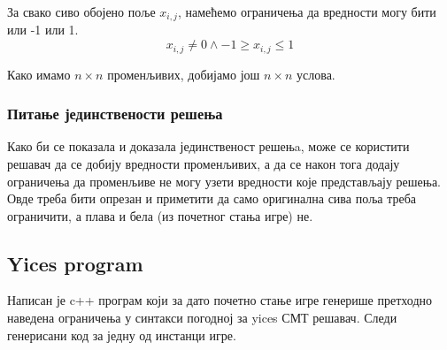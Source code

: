 \documentclass[a4paper]{article}
\begin{document}
За свако сиво обојено поље $x_{i, j}$, намећемо ограничења да вредности могу бити или -1 или 1.
$$
    x_{i, j} \neq 0 \land -1 \geq x_{i, j} \leq 1
$$

Како имамо $n \times n$ променљивих, добијамо још $n \times n$ услова.

\subsubsection{Питање јединствености решења}
Како би се показала и доказала јединственост решењa, може се користити решавач да се добију вредности променљивих, а да се након тога
додају ограничења да променљиве не могу узети вредности које представљају решења. Овде треба бити опрезан и приметити да само оригинална сива
поља треба ограничити, а плава и бела (из почетног стања игре) не.

\subsection{Yices program}
Написан је c++ програм који за дато почетно стање игре генерише претходно наведена ограничења у синтакси погодној за
yices СМТ решавач. Следи генерисани код за једну од инстанци игре.
\end{document}
